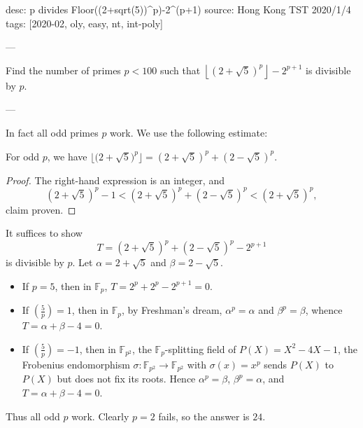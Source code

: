 desc: p divides Floor((2+sqrt(5))^p)-2^(p+1)
source: Hong Kong TST 2020/1/4
tags: [2020-02, oly, easy, nt, int-poly]

---

Find the number of primes $p<100$ such that $\left\lfloor(2+\sqrt5)^p\right\rfloor-2^{p+1}$ is divisible by $p$.

---

In fact all odd primes $p$ work. We use the following estimate:
\begin{claim*}
    For odd $p$, we have $\big\lfloor\big(2+\sqrt5\big)^p\big\rfloor=\left(2+\sqrt5\right)^p+\left(2-\sqrt5\right)^p$.
\end{claim*}
\begin{proof}
    The right-hand expression is an integer, and \[\textstyle\left(2+\sqrt5\right)^p-1<\left(2+\sqrt5\right)^p+\left(2-\sqrt5\right)^p<\left(2+\sqrt5\right)^p,\]
    claim proven.
\end{proof}

It suffices to show \[T=\textstyle\left(2+\sqrt5\right)^p+\left(2-\sqrt5\right)^p-2^{p+1}\]
is divisible by $p$. Let $\alpha=2+\sqrt5$ and $\beta=2-\sqrt5$.
\begin{itemize}
    \item If $p=5$, then in $\mathbb F_p$, $T=2^p+2^p-2^{p+1}=0$.
    \item If $\left(\tfrac5p\right)=1$, then in $\mathbb F_p$, by Freshman's dream, $\alpha^p=\alpha$ and $\beta^p=\beta$, whence $T=\alpha+\beta-4=0$.
    \item If $\left(\frac5p\right)=-1$, then in $\mathbb F_{p^2}$, the $\mathbb F_p$-splitting field of $P(X)=X^2-4X-1$, the Frobenius endomorphism $\sigma:\mathbb F_{p^2}\to\mathbb F_{p^2}$ with $\sigma(x)=x^p$ sends $P(X)$ to $P(X)$ but does not fix its roots. Hence $\alpha^p=\beta$, $\beta^p=\alpha$, and $T=\alpha+\beta-4=0$.
\end{itemize}
Thus all odd $p$ work. Clearly $p=2$ fails, so the answer is $24$.
